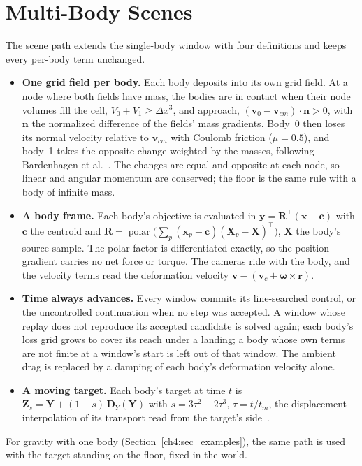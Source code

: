 \section{Multi-Body Scenes}
\label{ch4:sec_scene}
The scene path extends the single-body window with four definitions and keeps every per-body term unchanged.
\begin{itemize}
  \item \textbf{One grid field per body.} Each body deposits into its own grid field. At a node where both fields have
        mass, the bodies are in contact when their node volumes fill the cell, $V_0+V_1\ge\Delta x^3$, and approach,
        $(\mathbf{v}_0-\mathbf{v}_{cm})\cdot\mathbf{n}>0$, with $\mathbf{n}$ the normalized difference of the fields' mass
        gradients. Body~0 then loses its normal velocity relative to $\mathbf{v}_{cm}$ with Coulomb friction ($\mu=0.5$), and
        body~1 takes the opposite change weighted by the masses, following Bardenhagen et
        al.~\citep{bardenhagen2000granular}. The changes are equal and opposite at each node, so linear and angular momentum
        are conserved; the floor is the same rule with a body of infinite mass.
  \item \textbf{A body frame.} Each body's objective is evaluated in $\mathbf{y}=\mathbf{R}^{\top}(\mathbf{x}-\mathbf{c})$ with
        $\mathbf{c}$ the centroid and $\mathbf{R}=\operatorname{polar}\big(\sum_p(\mathbf{x}_p-\mathbf{c})(\mathbf{X}_p-\bar{\mathbf{X}})^{\top}\big)$,
        $\mathbf{X}$ the body's source sample. The polar factor is differentiated exactly, so the position gradient carries no
        net force or torque. The cameras ride with the body, and the velocity terms read the deformation velocity
        $\mathbf{v}-(\mathbf{v}_c+\boldsymbol{\omega}\times\mathbf{r})$.
  \item \textbf{Time always advances.} Every window commits its line-searched control, or the uncontrolled continuation when
        no step was accepted. A window whose replay does not reproduce its accepted candidate is solved again; each body's
        loss grid grows to cover its reach under a landing; a body whose own terms are not finite at a window's start is left
        out of that window. The ambient drag is replaced by a damping of each body's deformation velocity alone.
  \item \textbf{A moving target.} Each body's target at time $t$ is
        $\mathbf{Z}_s=\mathbf{Y}+(1-s)\,\mathbf{D}_Y(\mathbf{Y})$ with $s=3\tau^2-2\tau^3$, $\tau=t/t_m$, the displacement
        interpolation of its transport read from the target's side~\citep{mccann1997convexity}.
\end{itemize}
For gravity with one body (Section~\ref{ch4:sec_examples}), the same path is used with the target standing on the floor,
fixed in the world.


